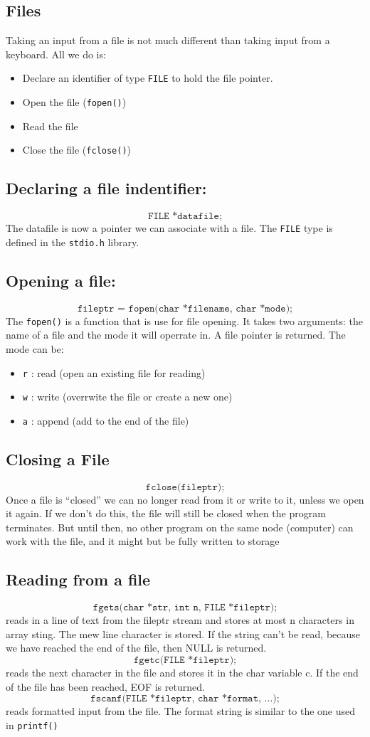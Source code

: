 \documentclass[a4paper, 10pt]{article}
\begin{document}
\subsection{Files}
Taking an input from a file is not much different than taking input from a keyboard. All we do is:
\begin{itemize}
    \item Declare an identifier of type \texttt{FILE} to hold the file pointer.
    \item Open the file (\texttt{fopen()})
    \item Read the file
    \item Close the file (\texttt{fclose()})
\end{itemize}
\subsection{Declaring a file indentifier:}
$$\texttt{FILE *datafile;}$$
The datafile is now a pointer we can associate with a file. The \texttt{FILE} type is defined in the \texttt{stdio.h} library.
\subsection{Opening a file:}
$$\texttt{fileptr = fopen(char *filename, char *mode);}$$
The \texttt{fopen()} is a function that is use for file opening. It takes two arguments: the name of a file and the mode it will operrate in. A file pointer is returned. The mode can be:
\begin{itemize}
    \item \texttt{r} : read (open an existing file for reading)
    \item \texttt{w} : write (overrwite the file or create a new one)
    \item \texttt{a} : append (add to the end of the file)
\end{itemize}
\subsection{Closing a File}
$$\texttt{fclose(fileptr);}$$
Once a file is “closed” we can no longer read from it or write to it, unless
we open it again. If we don't do this, the file will still be closed when the
program terminates. But until then, no other program on the same node
(computer) can work with the file, and it might but be fully written to
storage
\subsection{Reading from a file}
$$\texttt{fgets(char *str, int n, FILE *fileptr);}$$
reads in a line of text from the fileptr stream and stores at most n
characters in array sting. The mew line character is stored.
If the string can't be read, because we have reached the end of the file,
then NULL is returned.
$$\texttt{fgetc(FILE *fileptr);}$$
reads the next character in the file and stores it in the char variable c. If
the end of the file has been reached, EOF is returned.
$$\texttt{fscanf(FILE *fileptr, char *format, ...);}$$
reads formatted input from the file. The format string is similar to the
one used in \texttt{printf()}
\end{document}
